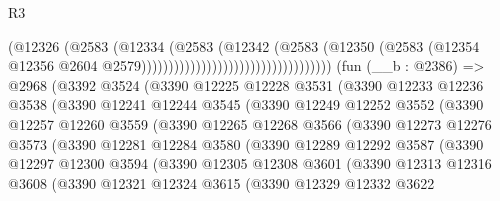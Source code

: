 \begin{lexlean}{R3}
\begin{coremodule}
                                                        (@12326
                                                          (@2583
                                                            (@12334
                                                              (@2583
                                                                (@12342
                                                                  (@2583
                                                                    (@12350
                                                                      (@2583
                                                                        (@12354
                                                                          @12356
                                                                          @2604
                                                                          @2579)))))))))))))))))))))))))))))))))))
    (fun (__b : @2386) =>
    @2968
      (@3392
        @3524
        (@3390
          @12225
          @12228
          @3531
          (@3390
            @12233
            @12236
            @3538
            (@3390
              @12241
              @12244
              @3545
              (@3390
                @12249
                @12252
                @3552
                (@3390
                  @12257
                  @12260
                  @3559
                  (@3390
                    @12265
                    @12268
                    @3566
                    (@3390
                      @12273
                      @12276
                      @3573
                      (@3390
                        @12281
                        @12284
                        @3580
                        (@3390
                          @12289
                          @12292
                          @3587
                          (@3390
                            @12297
                            @12300
                            @3594
                            (@3390
                              @12305
                              @12308
                              @3601
                              (@3390
                                @12313
                                @12316
                                @3608
                                (@3390
                                  @12321
                                  @12324
                                  @3615
                                  (@3390
                                    @12329
                                    @12332
                                    @3622

\end{coremodule}
\end{lexlean}
